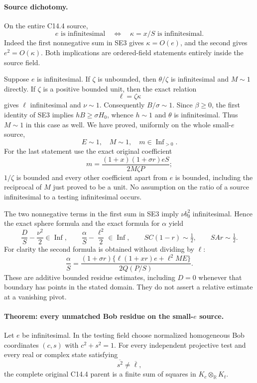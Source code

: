 \paragraph{Source dichotomy.}
On the entire C14.4 source,
\[
 e\text{ is infinitesimal}\quad\Longleftrightarrow\quad
 \kappa=x/S\text{ is infinitesimal}.\tag{SE4}
\]
Indeed the first nonnegative sum in SE3 gives $\kappa=O(e)$,
and the second gives $e^2=O(\kappa)$. Both implications are
ordered-field statements entirely inside the source field.

Suppose $e$ is infinitesimal. If $\zeta$ is unbounded, then
$\theta/\zeta$ is infinitesimal and $M\sim1$ directly. If $\zeta$
is a positive bounded unit, then the exact relation
\[
                  \ell=\zeta\kappa\tag{SE5}
\]
gives $\ell$ infinitesimal and $\nu\sim1$. Consequently
$B/\sigma\sim1$. Since $\beta\ge0$, the first identity of SE3
implies $hB\ge\sigma H_0$, whence $h\sim1$ and $\theta$ is
infinitesimal. Thus $M\sim1$ in this case as well. We have proved,
uniformly on the whole small-$e$ source,
\[
                    E\sim1,\quad M\sim1,\quad m\in\operatorname{Inf}_{>0}.
                    \tag{SE6}
\]
For the last statement use the exact original coefficient
\[
 m=\frac{(1+x)(1+\sigma r)eS}{2M\zeta P};\tag{SE7}
\]
$1/\zeta$ is bounded and every other coefficient apart from $e$ is
bounded, including the reciprocal of $M$ just proved to be a unit.
No assumption on the ratio of a source infinitesimal to a testing
infinitesimal occurs.

The two nonnegative terms in the first sum in SE3 imply
$\nu b_0^2$ infinitesimal. Hence the exact sphere formula and the
exact formula for $\alpha$ yield
\[
 \frac DS-\frac{\nu^2}{2}\in\operatorname{Inf},\qquad
 \frac\alpha S-\frac{\ell^2}{2}\in\operatorname{Inf},\qquad
 SC(1-r)\sim\tfrac12,\qquad SAr\sim\tfrac12.\tag{SE8}
\]
For clarity the second formula is obtained without dividing by $\ell$:
\[
 \frac\alpha S=
 \frac{(1+\sigma r)\{\ell(1+xr)e+\ell^2ME\}}
      {2Q(P/S)}.\tag{SE9}
\]
These are additive bounded residue estimates, including $D=0$ whenever
that boundary has points in the stated domain. They do not assert a
relative estimate at a vanishing pivot.

\paragraph{Theorem: every unmatched Bob residue on the small-$e$ source.}
Let $e$ be infinitesimal. In the testing field choose normalized homogeneous
Bob coordinates $(c,s)$ with $c^2+s^2=1$. For every independent projective
test and every real or complex state satisfying
\[
                         \overline{s^2}\ne\overline\ell,\tag{SE10}
\]
the complete original C14.4 parent is a finite sum of squares in
$K_c\otimes_{\mathbb R}K_t$.

